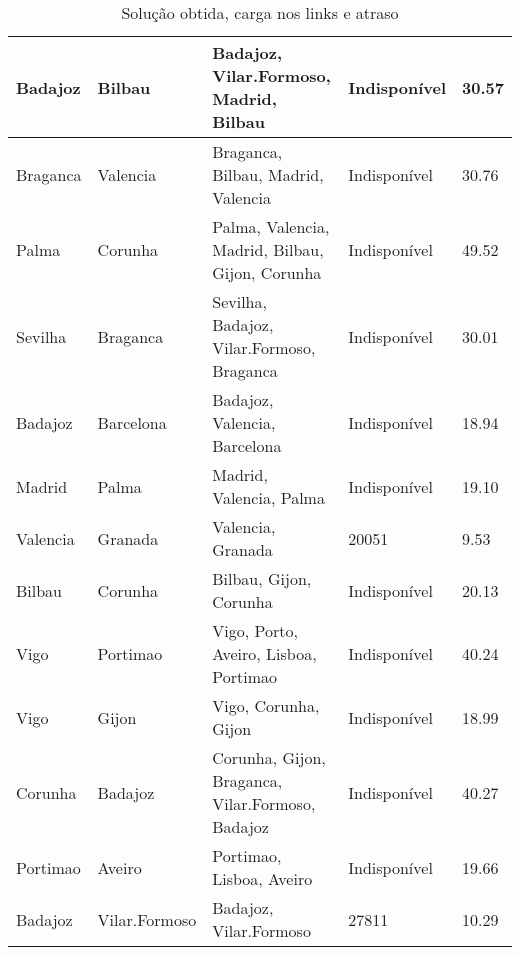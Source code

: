 \begin{table}[!htb]
{\begin{tabular}{|l|l|l|l|l|}
Badajoz & Bilbau & Badajoz, Vilar.Formoso, Madrid, Bilbau & Indisponível & 30.57 \\ \hline
Braganca & Valencia & Braganca, Bilbau, Madrid, Valencia & Indisponível & 30.76 \\ \hline
Palma & Corunha & Palma, Valencia, Madrid, Bilbau, Gijon, Corunha & Indisponível & 49.52 \\ \hline
Sevilha & Braganca & Sevilha, Badajoz, Vilar.Formoso, Braganca & Indisponível & 30.01 \\ \hline
Badajoz & Barcelona & Badajoz, Valencia, Barcelona & Indisponível & 18.94 \\ \hline
Madrid & Palma & Madrid, Valencia, Palma & Indisponível & 19.10 \\ \hline
Valencia & Granada & Valencia, Granada & 20051 & 9.53 \\ \hline
Bilbau & Corunha & Bilbau, Gijon, Corunha & Indisponível & 20.13 \\ \hline
Vigo & Portimao & Vigo, Porto, Aveiro, Lisboa, Portimao & Indisponível & 40.24 \\ \hline
Vigo & Gijon & Vigo, Corunha, Gijon & Indisponível & 18.99 \\ \hline
Corunha & Badajoz & Corunha, Gijon, Braganca, Vilar.Formoso, Badajoz & Indisponível & 40.27 \\ \hline
Portimao & Aveiro & Portimao, Lisboa, Aveiro & Indisponível & 19.66 \\ \hline
Badajoz & Vilar.Formoso & Badajoz, Vilar.Formoso & 27811 & 10.29 \\ \hline
\end{tabular}}
\caption[]{Solução obtida, carga nos links e atraso}
\end{table}

